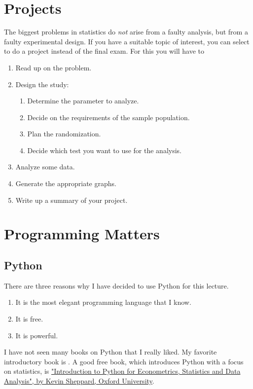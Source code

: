 \section{Projects}

The biggest problems in statistics do \emph{not} arise from a faulty analysis, but from a faulty experimental design. If you have a suitable topic of interest, you can select to do a project instead of the final exam. For this you will have to

\begin{enumerate}
  \item Read up on the problem.
  \item Design the study:

  \begin{enumerate}
    \item Determine the parameter to analyze.
    \item Decide on the requirements of the sample population.
    \item Plan the randomization.
    \item Decide which test you want to use for the analysis.
  \end{enumerate}

  \item Analyze some data.
  \item Generate the appropriate graphs.
  \item Write up a summary of your project.
\end{enumerate}

\section{Programming Matters}

\subsection{Python}


There are three reasons why I have decided to use Python for this lecture.

\begin{enumerate}
  \item It is the most elegant programming language that I know.
  \item It is free.
  \item It is powerful.
\end{enumerate}

I have not seen many books on Python that I really liked. My favorite introductory book is \cite{Harms2010}.
A good free book, which introduces Python with a focus on statistics, is \href{http://www.kevinsheppard.com/images/0/09/Python_introduction.pdf} {"Introduction to Python for Econometrics, Statistics and Data Analysis", by Kevin Sheppard, Oxford University}.

